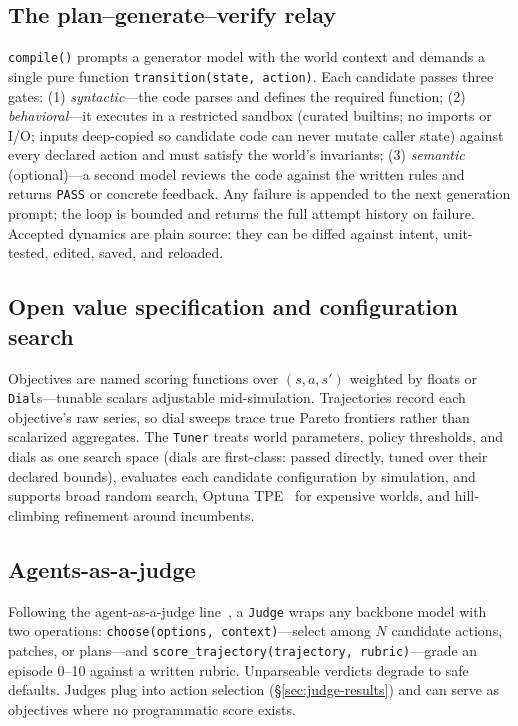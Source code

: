 \documentclass[11pt]{article}
\begin{document}
\subsection{The plan--generate--verify relay}
\texttt{compile()} prompts a generator model with the world context and
demands a single pure function \texttt{transition(state, action)}. Each
candidate passes three gates: (1) \emph{syntactic}---the code parses and
defines the required function; (2) \emph{behavioral}---it executes in a
restricted sandbox (curated builtins; no imports or I/O; inputs deep-copied so
candidate code can never mutate caller state) against every declared action
and must satisfy the world's invariants; (3) \emph{semantic}
(optional)---a second model reviews the code against the written rules and
returns \texttt{PASS} or concrete feedback. Any failure is appended to the
next generation prompt; the loop is bounded and returns the full attempt
history on failure. Accepted dynamics are plain source: they can be diffed
against intent, unit-tested, edited, saved, and reloaded.

\subsection{Open value specification and configuration search}
Objectives are named scoring functions over $(s, a, s')$ weighted by floats or
\texttt{Dial}s---tunable scalars adjustable mid-simulation. Trajectories
record each objective's raw series, so dial sweeps trace true Pareto frontiers
rather than scalarized aggregates. The \texttt{Tuner} treats world parameters,
policy thresholds, and dials as one search space (dials are first-class:
passed directly, tuned over their declared bounds), evaluates each candidate
configuration by simulation, and supports broad random search, Optuna
TPE~\cite{optuna2019} for expensive worlds, and hill-climbing refinement
around incumbents.

\subsection{Agents-as-a-judge}
Following the agent-as-a-judge line~\cite{agentasjudge2024,llmjudge2023}, a
\texttt{Judge} wraps any backbone model with two operations:
\texttt{choose(options, context)}---select among $N$ candidate actions,
patches, or plans---and \texttt{score\_trajectory(trajectory,
rubric)}---grade an episode 0--10 against a written rubric. Unparseable
verdicts degrade to safe defaults. Judges plug into action selection
(\S\ref{sec:judge-results}) and can serve as objectives where no programmatic
score exists.
\end{document}
